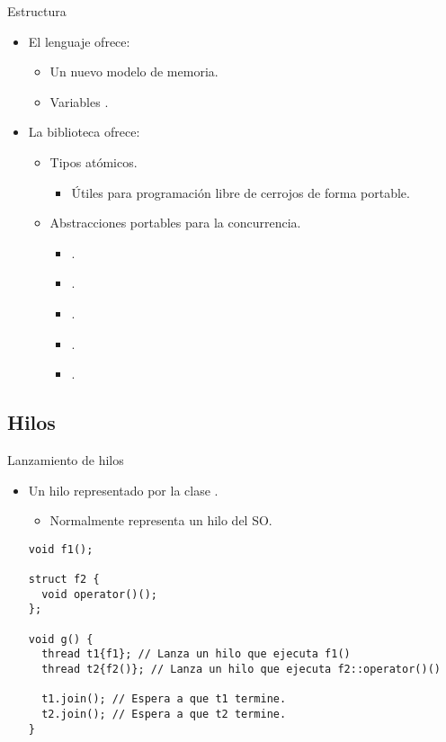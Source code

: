 \begin{frame}{Estructura}
\begin{itemize}
  \item El lenguaje ofrece:
    \begin{itemize}
      \item Un nuevo modelo de memoria.
      \item Variables .
    \end{itemize}
  \item La biblioteca ofrece:
    \begin{itemize}
      \item Tipos atómicos.
        \begin{itemize}
          \item Útiles para programación libre de cerrojos de forma portable.
        \end{itemize}
      \item Abstracciones portables para la concurrencia.
        \begin{itemize}
          \item {}.
          \item {}.
          \item {}.
          \item {}.
          \item {}.
        \end{itemize}
    \end{itemize}
\end{itemize}
\end{frame}

\subsection{Hilos}

\begin{frame}[fragile]{Lanzamiento de hilos}
\begin{itemize}
  \item Un hilo representado por la clase .
    \begin{itemize}
      \item Normalmente representa un hilo del SO.
    \end{itemize}
\begin{lstlisting}
void f1();

struct f2 {
  void operator()();
};

void g() {
  thread t1{f1}; // Lanza un hilo que ejecuta f1()
  thread t2{f2()}; // Lanza un hilo que ejecuta f2::operator()()

  t1.join(); // Espera a que t1 termine.
  t2.join(); // Espera a que t2 termine.
}
\end{lstlisting}
\end{itemize}
\end{frame}

